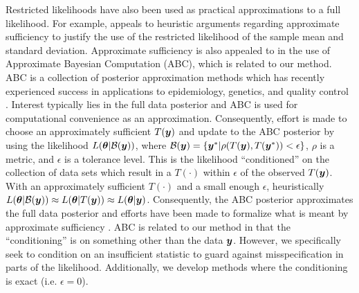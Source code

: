 \documentclass[ba]{imsart}
\def\bth{\mbox{\boldmath $\theta$}}
\newcommand{\by}{\mbox{\boldmath $y$}}
\newcommand{\bz}{\mbox{\boldmath $z$}}
\begin{document}
Restricted likelihoods have also been used as practical approximations to a full likelihood. For example, \cite{pratt1965} appeals to heuristic arguments regarding approximate sufficiency to justify the use of the restricted likelihood of the sample mean and standard deviation. Approximate sufficiency is also appealed to in the use of Approximate Bayesian Computation (ABC), which is related to our method.  
ABC is a collection of posterior approximation methods which has recently experienced success in applications to epidemiology, genetics, and quality control \citep[see, for example,][]{tavare1997, pritchard1999,  marjoram2003, fearnhead2012}. Interest typically lies in the full data posterior and ABC is used for computational convenience as an approximation.  Consequently, effort is made to choose an approximately sufficient $T(\by)$ and update to the ABC posterior by using the likelihood $L(\bth| \mathcal{B}(\by))$, where $\mathcal{B}(\by)=\{\by^{*}|\rho(T(\by),T(\by^{*}))<\epsilon\}$, $\rho$ is a metric, and $\epsilon$ is a tolerance level. This is the likelihood ``conditioned'' on the collection of data sets which result in a $T(\cdot)$ within $\epsilon$ of the observed $T(\by)$. %
With an approximately sufficient $T(\cdot)$ and a small enough $\epsilon$, heuristically  $L(\bth|\mathcal{B}(\by))\approx L(\bth|T(\by))\approx L(\bth|\by)$. Consequently, the ABC posterior approximates the full data posterior and efforts have been made to formalize what is meant by  approximate sufficiency \citep[e.g.,][]{joyce2008}. ABC is related to our method in that the ``conditioning'' is on something other than the data $\by$.  However, we specifically seek to condition on an insufficient statistic to guard against misspecification in parts of the likelihood. Additionally, we develop methods where the conditioning is exact (i.e. $\epsilon = 0$).


\end{document}
